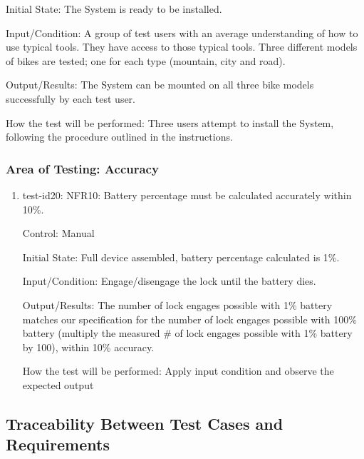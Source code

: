 \documentclass[12pt, titlepage]{article}
\begin{document}
\begin{enumerate}
Initial State: The System is ready to be installed. 

Input/Condition: A group of test users with an average understanding of how to use typical tools. They have access to those typical tools. Three different models of bikes are tested; one for each type (mountain, city and road). 

Output/Results: The System can be mounted on all three bike models successfully by each test user. 

How the test will be performed: Three users attempt to install the System, following the procedure outlined in the instructions.  

\end{enumerate}

\subsubsection{Area of Testing: Accuracy}

\begin{enumerate}

\item{test-id20: NFR10: Battery percentage must be calculated accurately within 10\%. \\}

Control: Manual

Initial State: Full device assembled, battery percentage calculated is 1\%. 

Input/Condition: Engage/disengage the lock until the battery dies.

Output/Results: The number of lock engages possible with 1\% battery matches our specification for the number of lock engages possible with 100\% battery (multiply the measured \# of lock engages possible with 1\% battery by 100), within 10\% accuracy.

How the test will be performed: Apply input condition and observe the expected output

\end{enumerate}

\subsection{Traceability Between Test Cases and Requirements}
\end{document}
